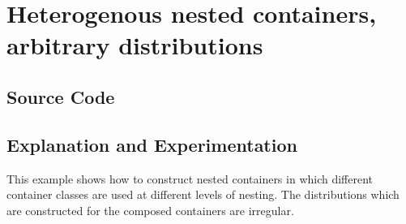 \documentclass{report}
\begin{document}

\pagebreak
\section{ Heterogenous nested containers, arbitrary distributions }

\subsection{Source Code}



\subsection{Explanation and Experimentation}

This example shows how to construct nested containers in which different
container classes are used at different levels of nesting.  
The distributions which are constructed for the composed containers
are irregular.

\end{document}
